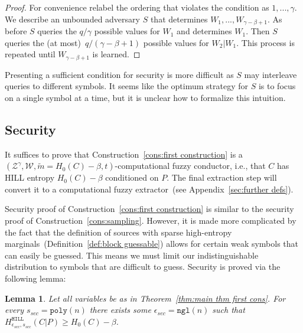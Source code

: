 \documentclass[11pt]{article}
\newtheorem{lemma}[theorem]{Lemma}
\newcommand{\apref}[1]{\mbox{Appendix~\ref{#1}}}
\newcommand{\thref}[1]{\mbox{Theorem~\ref{#1}}}
\newcommand{\defref}[1]{\mbox{Definition~\ref{#1}}}
\newcommand{\consref}[1]{\mbox{Construction~\ref{#1}}}
\newcommand{\hill}{\ensuremath{\mathtt{HILL}}\xspace}
\newcommand{\poly}{\ensuremath{\mathtt{poly}}\xspace}
\newcommand{\ngl}{\ensuremath{\mathtt{ngl}}\xspace}
\begin{document}
\begin{proof}
For convenience relabel the ordering that violates the condition as $1,..., \gamma$.  We describe an unbounded adversary $S$ that determines $W_1,..., W_{\gamma-\beta+1}$.  As before $S$ queries the $q /\gamma$ possible values for $W_1$ and determines $W_1$.  Then $S$ queries the (at most)~$q/(\gamma-\beta+1)$ possible values for $W_2 | W_1$.  This process is repeated until $W_{\gamma-\beta+1}$ is learned.
\end{proof}

Presenting a sufficient condition for security is more difficult as $S$ may interleave queries to different symbols.  It seems like the optimum strategy for $S$ is to focus on a single symbol at a time, but it is unclear how to formalize this intuition.


\subsection{Security}
It suffices to prove that \consref{cons:first construction} is a  $(\mathcal{Z}^\gamma, \mathcal{W}, \tilde{m}=H_0(C)-\beta, t)$-computational fuzzy conductor, i.e., that $C$ has HILL entropy $H_0(C)-\beta$ conditioned on $P$. The final extraction step will convert it to a computational fuzzy extractor~(see \apref{sec:further defs}).


Security proof of \consref{cons:first construction} is similar to the security proof of \consref{cons:sampling}.  However, it is made more complicated by the fact that the definition of sources with sparse high-entropy marginals~(\defref{def:block guessable}) allows for certain weak symbols that can easily be guessed.  This means we must limit our indistinguishable distribution to symbols that are difficult to guess.  Security is proved via the following lemma:

\begin{lemma}
\label{lem:security of cons}
Let all variables be as in \thref{thm:main thm first cons}.  For every $s_{sec} = \poly(n)$ there exists some $\epsilon_{sec} = \ngl(n)$ such that $H^{\hill}_{\epsilon_{sec}, s_{sec}}( C | P ) \geq H_0(C) - \beta$.
\end{lemma}
\end{document}
